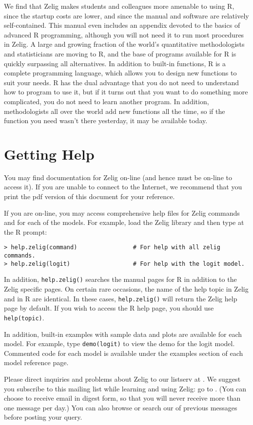 We find that Zelig makes students and colleagues more amenable to
using R, since the startup costs are lower, and since the manual and
software are relatively self-contained.  This manual even includes an
appendix devoted to the basics of advanced R programming, although you
will not need it to run most procedures in Zelig.  A large and growing
fraction of the world's quantitative methodologists and statisticians
are moving to R, and the base of programs available for R is quickly
surpassing all alternatives.  In addition to built-in functions, R is
a complete programming language, which allows you to design new
functions to suit your needs.  R has the dual advantage that you do
not need to understand how to program to use it, but if it turns out
that you want to do something more complicated, you do not need to
learn another program.  In addition, methodologists all over the world
add new functions all the time, so if the function you need wasn't
there yesterday, it may be available today.

\section{Getting Help}

You may find documentation for Zelig on-line (and hence must be
on-line to access it).  If you are unable to connect to the Internet,
we recommend that you print the pdf version of this document for your
reference.

If you are on-line, you may access comprehensive help files for Zelig
commands and for each of the models.  For example, load the Zelig
library and then type at the R prompt:
\begin{verbatim}
> help.zelig(command)                # For help with all zelig commands.
> help.zelig(logit)                  # For help with the logit model.  
\end{verbatim}
\label{Rhelp}In addition, {\tt help.zelig()} searches the manual pages 
for R in addition to the Zelig specific pages.  On certain rare
occasions, the name of the help topic in Zelig and in R are identical.
In these cases, {\tt help.zelig()} will return the Zelig help page by
default.  If you wish to access the R help page, you should use {\tt
  help(topic)}.

In addition, built-in examples with sample data and plots are
available for each model.  For example, type {\tt demo(logit)} to view
the demo for the logit model.  Commented code for each model is
available under the examples section of each model reference page.

Please direct inquiries and problems about Zelig to our listserv at
.  We
suggest you subscribe to this mailing list while learning and using
Zelig: go to .  (You can choose to receive email
in digest form, so that you will never receive more than one message
per day.)  You can also browse or search our
 of
previous messages before posting your query.


